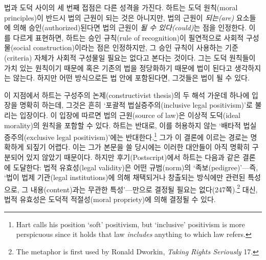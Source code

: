 \documentclass[12pt, oneside]{book}  %
\begin{document}
법과 도덕 사이의 세 번째 접점은 다른 성격을 가진다. 하트는 도덕
원칙(moral principles)이 반드시 법의 근원이 되는 것은 아니지만, 법의
근원이 \emph{되는(are)} 요소들에 의해 승인(authorized)된다면 법의 근원이
\emph{될 수 있다(could)}는 점을 인정한다. 이를 다르게 표현하면, 하트는
승인 규칙(rule of recognition)이 필연적으로 사회적 구성물(social
construction)이라는 점은 인정하지만, 그 승인 규칙이 사용하는
기준(criteria) 자체가 사회적 구성물일 필요는 없다고 본다는 것이다. 그는
도덕 원칙들이 가치 있는 원칙이기 때문에 혹은 기존의 법을 정당화하기
때문에 법이 된다고 생각하지는 않는다. 하지만 어떤 방식으로든 법 안에
포함된다면, 그것들은 법이 될 수 있다.

이 지점에서 하트는 구성주의 논제(constructivist thesis)의 두 해석 가운데
하나에 입장을 명확히 하는데, 그것은 흔히 `포괄적 법실증주의(inclusive
legal positivism)'로 불리는 입장이다. 이 입장에 따르면 법의 근원(source
of law)은 이상적 도덕(ideal morality)의 원칙을 포함할 수 있다. 하트는
반대로, 이를 허용하지 않는 `배타적 법실증주의(exclusive legal
positivism)'에는 반대한다.\footnote{Hart calls his position `soft'
  positivism, but `inclusive' positivism is more perspicuous since it
  holds that law \emph{includes} anything to which law refers.} 그가 이
결론에 이르는 경로는 명확하게 되짚기 어렵다. 이는 그가 본문을 쓸
당시에는 이러한 대안들이 아직 명확히 구분되어 있지 않았기 때문이다.
하지만 후기(Postscript)에서 하트는 다음과 같은 결론에 도달한다: 법적
유효성(legal validity)은 어떤 규범(norm)의 `족보(pedigree)'---즉, `법이
법제 기관(legal institutions)에 의해 채택되거나 창출되는 방식에만 관련된
특성으로, 그 내용(content)과는 무관한 특성'---만으로 결정될 필요는
없다(247쪽).\footnote{The metaphor is first used by Ronald Dworkin,
  \emph{Taking Rights Seriously} 17.} 대신, 법적 유효성은 도덕적
적절성(moral propriety)에 의해 결정될 수 있다.
\end{document}
